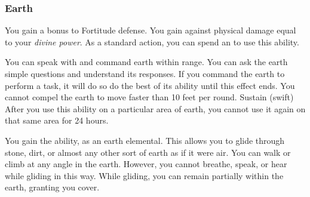         \subsubsection{Earth}
             You gain a  bonus to Fortitude defense.
             You gain  against physical damage equal to your \textit{divine power}.
             As a standard action, you can spend an  to use this ability.
            \begin{ability}
                \begin{spelltargetinginfo}
                    \spellrng{\rnglong}
                \end{spelltargetinginfo}
                \begin{spelleffects}
                    \spelleffect You can speak with and command earth within range.
                    You can ask the earth simple questions and understand its responses.
                    If you command the earth to perform a task, it will do so do the best of its ability until this effect ends.
                    You cannot compel the earth to move faster than 10 feet per round.
                    \spelldur Sustain (swift)
                    \spellspecial After you use this ability on a particular area of earth, you cannot use it again on that same area for 24 hours.
                \end{spelleffects}
            \end{ability}
             You gain the  ability, as an earth elemental.
            This allows you to glide through stone, dirt, or almost any other sort of earth as if it were air.
            You can walk or climb at any angle in the earth.
            However, you cannot breathe, speak, or hear while gliding in this way.
            While gliding, you can remain partially within the earth, granting you cover.

